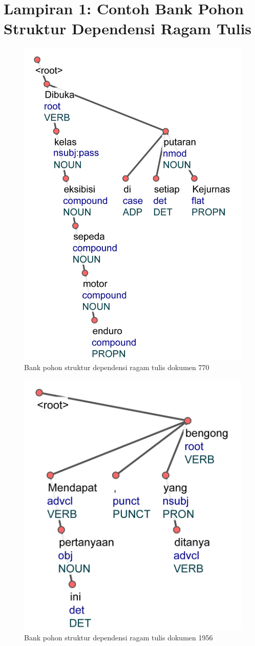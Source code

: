


\chapter*{Lampiran 1: Contoh Bank Pohon Struktur Dependensi Ragam Tulis}

\begin{figure}
	\centering \includegraphics[width=0.35
	\textwidth] {pics/lampiran/lampirants770.jpg} 
	\caption{Bank pohon struktur dependensi ragam tulis dokumen 770} 
	\label{fig:lampirants770} 
\end{figure}

\begin{figure}
	\centering \includegraphics[width=0.3
	\textwidth] {pics/lampiran/lampirants1956.jpg} 
	\caption{Bank pohon struktur dependensi ragam tulis dokumen 1956} 
	\label{fig:lampirants1956} 
\end{figure}

